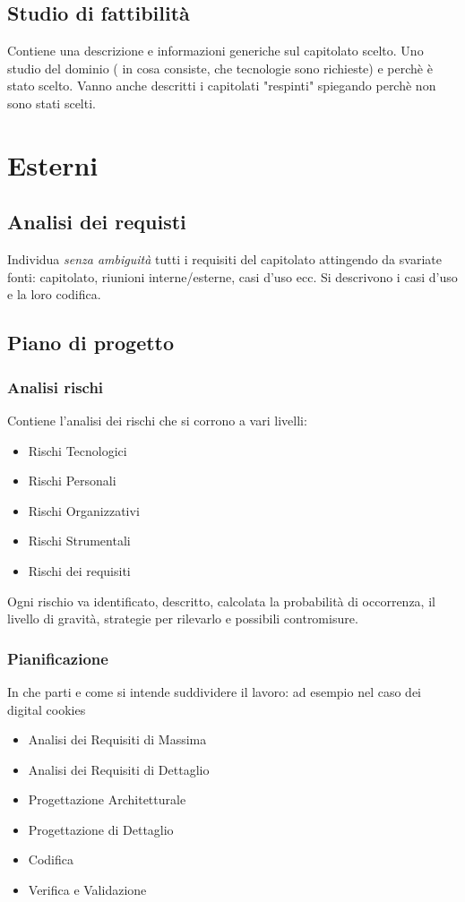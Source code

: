 \documentclass[a4paper]{article}
\begin{document}
\subsection{Studio di fattibilità}

Contiene una descrizione e informazioni generiche sul capitolato scelto. Uno studio del dominio ( in cosa consiste, che tecnologie sono richieste) e perchè è stato scelto. Vanno anche descritti i capitolati "respinti" spiegando perchè non sono stati scelti.

\section{Esterni}

\subsection{Analisi dei requisti}
Individua \emph{senza ambiguità} tutti i requisiti del capitolato attingendo da svariate fonti: capitolato, riunioni interne/esterne, casi d'uso ecc.
Si descrivono i casi d'uso e la loro codifica. 

\subsection{Piano di progetto}
\subsubsection{Analisi rischi}
Contiene l'analisi dei rischi che si corrono a vari livelli:
\begin{itemize}
\item Rischi Tecnologici 
\item Rischi Personali
\item Rischi Organizzativi
\item Rischi Strumentali
\item Rischi dei requisiti
\end{itemize}

Ogni rischio va identificato, descritto, calcolata la probabilità di occorrenza, il livello di gravità, strategie per rilevarlo e possibili contromisure.

\subsubsection{Pianificazione}
In che parti e come si intende suddividere il lavoro: ad esempio nel caso dei digital cookies
\begin{itemize}
\item Analisi dei Requisiti di Massima
\item Analisi dei Requisiti di Dettaglio
\item Progettazione Architetturale
\item Progettazione di Dettaglio
\item Codifica
\item Verifica e Validazione
\end{itemize}
\end{document}
